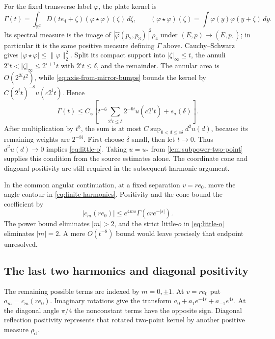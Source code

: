 \documentclass[11pt,letterpaper,reqno]{amsart}
\theoremstyle{definition}
\theoremstyle{remark}
\newcommand{\R}{\mathbb R}
\begin{document}
For the fixed transverse label $\varphi$, the plate kernel is
\[
 \Gamma(t)=\int_{\R^2}D(te_4+\zeta)
                         (\varphi\star\varphi)(\zeta)\,d\zeta,
 \qquad
 (\varphi\star\varphi)(\zeta)
       =\int\varphi(y)\varphi(y+\zeta)\,dy.
\]
Its spectral measure is the image of
$|\widehat\varphi(p_2,p_3)|^2\rho_4$ under $(E,p)\mapsto(E,p_1)$;
in particular it is the same positive measure defining $\Gamma$
above. Cauchy--Schwarz gives
$|\varphi\star\varphi|\le\|\varphi\|_2^2$. Split its compact
support into $|\zeta|_\infty\le t$, the annuli
$2^it<|\zeta|_\infty\le2^{i+1}t$ with $2^it\le\delta$, and the remainder.
The annular area is $O(2^{2i}t^2)$, while
\eqref{eq:axis-from-mirror-bumps} bounds the kernel by
$C(2^it)^{-8}u(c2^it)$. Hence
\begin{equation}\label{eq:transverse-decay-growth}
 \Gamma(t)\le C_\varphi\left[
 t^{-6}\sum_{2^it\le\delta}2^{-6i}u(c2^it)
                      +s_a(\delta)\right].
\end{equation}
After multiplication by $t^8$, the sum is at most
$C\sup_{0<d\le c\delta}d^2u(d)$, because its remaining weights
are $2^{-8i}$. First choose $\delta$ small, then let $t\to0$.
Thus $d^2u(d)\to0$ implies \eqref{eq:little-o}. Taking
$u=u_*$ from \cref{lem:subpower-two-point} supplies this condition
from the source estimates alone. The coordinate cone and diagonal
positivity are still required in the subsequent harmonic argument.

In the common angular continuation, at a fixed separation $v=re_0$, move the angle contour in
\eqref{eq:finite-harmonics}. Positivity and the cone bound the
coefficient by
\[
 |c_m(re_0)|\le e^{4ms}\Gamma(cr e^{-|s|}).
\]
The power bound eliminates $|m|>2$, and the strict little-$o$ in
\eqref{eq:little-o} eliminates $|m|=2$. A mere $O(t^{-8})$ bound
would leave precisely that endpoint unresolved.

\subsection{The last two harmonics and diagonal positivity}

The remaining possible terms are indexed by $m=0,\pm1$. At
$v=re_0$ put $a_m=c_m(re_0)$. Imaginary rotations give the transform
$a_0+a_1e^{-4s}+a_{-1}e^{4s}$. At the diagonal angle $\pi/4$ the
nonconstant terms have the opposite sign. Diagonal reflection
positivity represents that rotated two-point kernel by another
positive measure $\rho_{\mathrm d}$.
\end{document}
